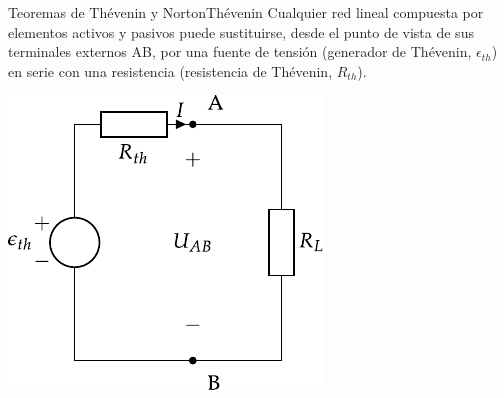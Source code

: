 \documentclass[aspectratio=169, xcolor={usenames,svgnames,dvipsnames}]{beamer}
\begin{document}
\begin{frame}{Teoremas de Thévenin y Norton}{Thévenin}
    Cualquier \alert{red lineal} compuesta por elementos activos y pasivos puede sustituirse, desde el punto de vista de sus terminales externos AB, por una \alert{fuente de tensión} (generador de Thévenin, \(\epsilon_{th}\)) en \alert{serie} con una resistencia (resistencia de Thévenin, \(R_{th}\)).
    
    \begin{center}
\includegraphics[width=.38\linewidth]{../figs/thevenin_continua.pdf}
\end{center}
\end{frame}
\end{document}
